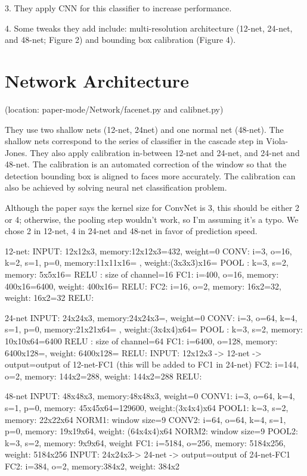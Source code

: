 \documentclass[twoside]{article}
\theoremstyle{definition}
\theoremstyle{definition}
\theoremstyle{remark}
\begin{document}
3. They apply CNN for this classifier to increase performance. 

4. Some tweaks they add include: multi-resolution architecture (12-net, 24-net, and 48-net; Figure 2) and bounding box calibration (Figure 4). 

\section{Network Architecture}

(location: paper-mode/Network/facenet.py and calibnet.py)

They use two shallow nets (12-net, 24net) and one normal net (48-net). The shallow nets correspond to the series of classifier in the cascade step in Viola-Jones. They also apply calibration in-between 12-net and 24-net, and 24-net and 48-net. The calibration is an automated correction of the window so that the detection bounding box is aligned to faces more accurately. The calibration can also be achieved by solving neural net classification problem. 

Although the paper says the kernel size for ConvNet is 3, this should be either 2 or 4; otherwise, the pooling step wouldn't work, so I'm assuming it's a typo. We chose 2 in 12-net, 4 in 24-net and 48-net in favor of prediction speed. 

12-net:
INPUT: 12x12x3, memory:12x12x3=432, weight=0
CONV: i=3, o=16, k=2, s=1, p=0, memory:11x11x16= , weight:(3x3x3)x16=
POOL : k=3, s=2, memory: 5x5x16=  
RELU : size of channel=16
FC1: i=400, o=16, memory: 400x16=6400, weight: 400x16=
RELU:
FC2: i=16, o=2, memory: 16x2=32, weight: 16x2=32
RELU: 

24-net
INPUT: 24x24x3, memory:24x24x3=, weight=0
CONV: i=3, o=64, k=4, s=1, p=0, memory:21x21x64= , weight:(3x4x4)x64=
POOL : k=3, s=2, memory: 10x10x64=6400 
RELU : size of channel=64
FC1: i=6400, o=128, memory: 6400x128=, weight: 6400x128=
RELU:
	INPUT: 12x12x3 -> 12-net -> output=output of 12-net-FC1 (this will be added to FC1 in 24-net)
FC2: i=144, o=2, memory: 144x2=288, weight: 144x2=288
RELU:

48-net
INPUT: 48x48x3, memory:48x48x3, weight=0
CONV1: i=3, o=64, k=4, s=1, p=0, memory: 45x45x64=129600, weight:(3x4x4)x64
POOL1: k=3, s=2, memory: 22x22x64
NORM1: window size=9
CONV2: i=64, o=64, k=4, s=1, p=0, memory: 19x19x64, weight: (64x4x4)x64
NORM2: window size=9
POOL2: k=3, s=2, memory: 9x9x64, weight
FC1: i=5184, o=256, memory: 5184x256, weight: 5184x256
	INPUT: 24x24x3-> 24-net -> output=output of 24-net-FC1
FC2: i=384, o=2, memory:384x2, weight: 384x2
\end{document}
